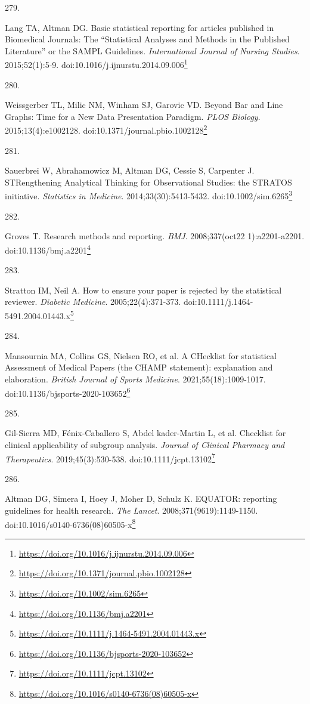 \documentclass[
  a4paper,
]{book}
\newlength{\cslhangindent}
\newlength{\csllabelwidth}
\newlength{\cslentryspacingunit} %
\newenvironment{CSLReferences}[2] %
 {%
  \setlength{\parindent}{0pt}
  \ifodd #1
  \let\oldpar\par
  \def\par{\hangindent=\cslhangindent\oldpar}
  \fi
  \setlength{\parskip}{#2\cslentryspacingunit}
 }%
 {}
\newcommand{\CSLLeftMargin}[1]{\parbox[t]{\csllabelwidth}{#1}}
\newcommand{\CSLRightInline}[1]{\parbox[t]{\linewidth - \csllabelwidth}{#1}\break}
\renewcommand{\href}[2]{#2\footnote{\url{#1}}}
\begin{document}
\begin{CSLReferences}{0}{0}
\leavevmode{}%
\CSLLeftMargin{279. }%
\CSLRightInline{Lang TA, Altman DG. Basic statistical reporting for articles published in Biomedical Journals: The {``}Statistical Analyses and Methods in the Published Literature{''} or the SAMPL Guidelines. \emph{International Journal of Nursing Studies}. 2015;52(1):5-9. doi:\href{https://doi.org/10.1016/j.ijnurstu.2014.09.006}{10.1016/j.ijnurstu.2014.09.006}}

\leavevmode{}%
\CSLLeftMargin{280. }%
\CSLRightInline{Weissgerber TL, Milic NM, Winham SJ, Garovic VD. Beyond Bar and Line Graphs: Time for a New Data Presentation Paradigm. \emph{PLOS Biology}. 2015;13(4):e1002128. doi:\href{https://doi.org/10.1371/journal.pbio.1002128}{10.1371/journal.pbio.1002128}}

\leavevmode{}%
\CSLLeftMargin{281. }%
\CSLRightInline{Sauerbrei W, Abrahamowicz M, Altman DG, Cessie S, Carpenter J. STRengthening Analytical Thinking for Observational Studies: the STRATOS initiative. \emph{Statistics in Medicine}. 2014;33(30):5413-5432. doi:\href{https://doi.org/10.1002/sim.6265}{10.1002/sim.6265}}

\leavevmode{}%
\CSLLeftMargin{282. }%
\CSLRightInline{Groves T. Research methods and reporting. \emph{BMJ}. 2008;337(oct22 1):a2201-a2201. doi:\href{https://doi.org/10.1136/bmj.a2201}{10.1136/bmj.a2201}}

\leavevmode{}%
\CSLLeftMargin{283. }%
\CSLRightInline{Stratton IM, Neil A. How to ensure your paper is rejected by the statistical reviewer. \emph{Diabetic Medicine}. 2005;22(4):371-373. doi:\href{https://doi.org/10.1111/j.1464-5491.2004.01443.x}{10.1111/j.1464-5491.2004.01443.x}}

\leavevmode{}%
\CSLLeftMargin{284. }%
\CSLRightInline{Mansournia MA, Collins GS, Nielsen RO, et al. A CHecklist for statistical Assessment of Medical Papers (the CHAMP statement): explanation and elaboration. \emph{British Journal of Sports Medicine}. 2021;55(18):1009-1017. doi:\href{https://doi.org/10.1136/bjsports-2020-103652}{10.1136/bjsports-2020-103652}}

\leavevmode{}%
\CSLLeftMargin{285. }%
\CSLRightInline{Gil-Sierra MD, Fénix-Caballero S, Abdel kader-Martin L, et al. Checklist for clinical applicability of subgroup analysis. \emph{Journal of Clinical Pharmacy and Therapeutics}. 2019;45(3):530-538. doi:\href{https://doi.org/10.1111/jcpt.13102}{10.1111/jcpt.13102}}

\leavevmode{}%
\CSLLeftMargin{286. }%
\CSLRightInline{Altman DG, Simera I, Hoey J, Moher D, Schulz K. EQUATOR: reporting guidelines for health research. \emph{The Lancet}. 2008;371(9619):1149-1150. doi:\href{https://doi.org/10.1016/s0140-6736(08)60505-x}{10.1016/s0140-6736(08)60505-x}}

\end{CSLReferences}


\end{document}
